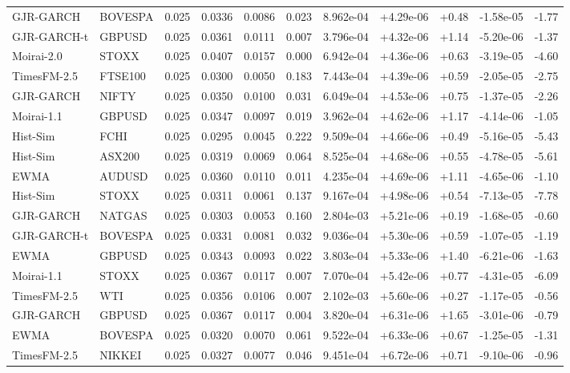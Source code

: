 \begin{tabular}{llrrrrrrrrr}
GJR-GARCH & BOVESPA & 0.025 & 0.0336 & 0.0086 & 0.023 & 8.962e-04 & +4.29e-06 & +0.48 & -1.58e-05 & -1.77 \\
GJR-GARCH-t & GBPUSD & 0.025 & 0.0361 & 0.0111 & 0.007 & 3.796e-04 & +4.32e-06 & +1.14 & -5.20e-06 & -1.37 \\
Moirai-2.0 & STOXX & 0.025 & 0.0407 & 0.0157 & 0.000 & 6.942e-04 & +4.36e-06 & +0.63 & -3.19e-05 & -4.60 \\
TimesFM-2.5 & FTSE100 & 0.025 & 0.0300 & 0.0050 & 0.183 & 7.443e-04 & +4.39e-06 & +0.59 & -2.05e-05 & -2.75 \\
GJR-GARCH & NIFTY & 0.025 & 0.0350 & 0.0100 & 0.031 & 6.049e-04 & +4.53e-06 & +0.75 & -1.37e-05 & -2.26 \\
Moirai-1.1 & GBPUSD & 0.025 & 0.0347 & 0.0097 & 0.019 & 3.962e-04 & +4.62e-06 & +1.17 & -4.14e-06 & -1.05 \\
Hist-Sim & FCHI & 0.025 & 0.0295 & 0.0045 & 0.222 & 9.509e-04 & +4.66e-06 & +0.49 & -5.16e-05 & -5.43 \\
Hist-Sim & ASX200 & 0.025 & 0.0319 & 0.0069 & 0.064 & 8.525e-04 & +4.68e-06 & +0.55 & -4.78e-05 & -5.61 \\
EWMA & AUDUSD & 0.025 & 0.0360 & 0.0110 & 0.011 & 4.235e-04 & +4.69e-06 & +1.11 & -4.65e-06 & -1.10 \\
Hist-Sim & STOXX & 0.025 & 0.0311 & 0.0061 & 0.137 & 9.167e-04 & +4.98e-06 & +0.54 & -7.13e-05 & -7.78 \\
GJR-GARCH & NATGAS & 0.025 & 0.0303 & 0.0053 & 0.160 & 2.804e-03 & +5.21e-06 & +0.19 & -1.68e-05 & -0.60 \\
GJR-GARCH-t & BOVESPA & 0.025 & 0.0331 & 0.0081 & 0.032 & 9.036e-04 & +5.30e-06 & +0.59 & -1.07e-05 & -1.19 \\
EWMA & GBPUSD & 0.025 & 0.0343 & 0.0093 & 0.022 & 3.803e-04 & +5.33e-06 & +1.40 & -6.21e-06 & -1.63 \\
Moirai-1.1 & STOXX & 0.025 & 0.0367 & 0.0117 & 0.007 & 7.070e-04 & +5.42e-06 & +0.77 & -4.31e-05 & -6.09 \\
TimesFM-2.5 & WTI & 0.025 & 0.0356 & 0.0106 & 0.007 & 2.102e-03 & +5.60e-06 & +0.27 & -1.17e-05 & -0.56 \\
GJR-GARCH & GBPUSD & 0.025 & 0.0367 & 0.0117 & 0.004 & 3.820e-04 & +6.31e-06 & +1.65 & -3.01e-06 & -0.79 \\
EWMA & BOVESPA & 0.025 & 0.0320 & 0.0070 & 0.061 & 9.522e-04 & +6.33e-06 & +0.67 & -1.25e-05 & -1.31 \\
TimesFM-2.5 & NIKKEI & 0.025 & 0.0327 & 0.0077 & 0.046 & 9.451e-04 & +6.72e-06 & +0.71 & -9.10e-06 & -0.96 \\

\end{tabular}
